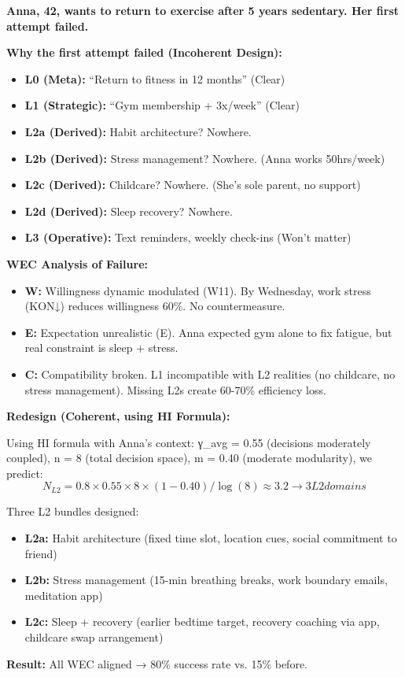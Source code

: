 \documentclass[11pt, a4paper]{article}
\begin{document}
\begin{tcolorbox}[colback=green!5!white, colframe=green!75!black, title=Intuition: Anna's Intervention Redesign]

\textbf{Anna, 42, wants to return to exercise after 5 years sedentary. Her first attempt failed.}

\textbf{Why the first attempt failed (Incoherent Design):}
\begin{itemize}[nosep]
\item \textbf{L0 (Meta):} ``Return to fitness in 12 months'' (Clear)
\item \textbf{L1 (Strategic):} ``Gym membership + 3x/week'' (Clear)
\item \textbf{L2a (Derived):} Habit architecture? Nowhere.
\item \textbf{L2b (Derived):} Stress management? Nowhere. (Anna works 50hrs/week)
\item \textbf{L2c (Derived):} Childcare? Nowhere. (She's sole parent, no support)
\item \textbf{L2d (Derived):} Sleep recovery? Nowhere.
\item \textbf{L3 (Operative):} Text reminders, weekly check-ins (Won't matter)
\end{itemize}

\textbf{WEC Analysis of Failure:}
\begin{itemize}[nosep]
\item \textbf{W:} Willingness dynamic modulated (W11). By Wednesday, work stress (KON↓) reduces willingness 60\%. No countermeasure.
\item \textbf{E:} Expectation unrealistic (E). Anna expected gym alone to fix fatigue, but real constraint is sleep + stress.
\item \textbf{C:} Compatibility broken. L1 incompatible with L2 realities (no childcare, no stress management). Missing L2s create 60-70\% efficiency loss.
\end{itemize}

\textbf{Redesign (Coherent, using HI Formula):}

Using HI formula with Anna's context: γ_avg = 0.55 (decisions moderately coupled), n = 8 (total decision space), m = 0.40 (moderate modularity), we predict:
$$N_{L2} = 0.8 \times 0.55 \times 8 \times (1-0.40) / \log(8) \approx 3.2 \rightarrow 3 L2 domains$$

Three L2 bundles designed:
\begin{itemize}[nosep]
\item \textbf{L2a:} Habit architecture (fixed time slot, location cues, social commitment to friend)
\item \textbf{L2b:} Stress management (15-min breathing breaks, work boundary emails, meditation app)
\item \textbf{L2c:} Sleep + recovery (earlier bedtime target, recovery coaching via app, childcare swap arrangement)
\end{itemize}

\textbf{Result:} All WEC aligned → 80\% success rate vs. 15\% before.

\end{tcolorbox}
\end{document}
